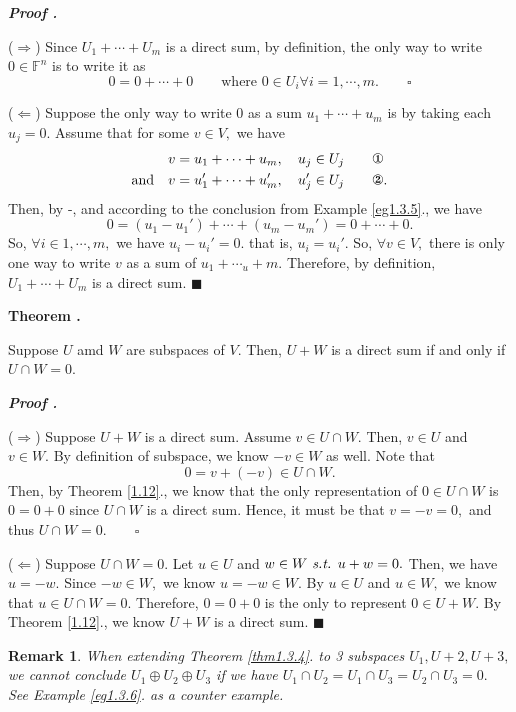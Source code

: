 \documentclass[11pt, letterpaper]{article}
\newcounter{neg}[subsection]
\newcommand*{\egref}[1]{Example \ref{#1}.\theneg}
\newcounter{nthm}[subsection]
\newenvironment*{thm}[1]{\begin{framed}\par\noindent\textbf{Theorem \thesubsection.\stepcounter{nthm}\thenthm\ #1} \par}{\par\end{framed}}
\newcommand*{\thmref}[1]{Theorem \ref{#1}.\thenthm}
\newcounter{nprf}[subsection]
\newenvironment*{prf}{\par\noindent\textbf{\textit{Proof \stepcounter{nprf}\thenprf.}}}{\hfill$\blacksquare$\par}
\newtheorem*{rmk}{Remark}
\def\F{\mathbb{F}}
\def\st{\emph{ s.t. }}
\begin{document}
	\begin{prf}
		\par ($\Rightarrow$) Since $U_1+\cdots+U_m$ is a direct sum, by definition, the only way to write $0\in\F^n$ is to write it as \[0=0+\cdots+0\qquad\text{where }0\in U_i\forall i=1,\cdots,m.\qquad\square\]\par 
		($\Leftarrow$) Suppose the only way to write $0$ as a sum $u_1+\cdots+u_m$ is by taking each $u_j=0.$ Assume that for some $v\in V,$ we have \[\begin{aligned}v&=u_1+\cdots+u_m,\quad u_j\in U_j\qquad\text{\ding{172}}\\\text{and}\quad v&=u_1'+\cdots+u_m',\quad u_j'\in U_j \qquad\text{\ding{173}}.\end{aligned}\] Then, by -, and according to the conclusion from \egref{eg1.3.5}, we have \[0=(u_1-u_1')+\cdots+(u_m-u_m')=0+\cdots+0.\] So, $\forall i\in 1,\cdots,m,$ we have $u_i-u_i'=0.$ that is, $u_i=u_i'.$ So, $\forall v\in V,$ there is only one way to write $v$ as a sum of $u_1+\cdots_u+m.$ Therefore, by definition, $U_1+\cdots+U_m$ is a direct sum. 
	\end{prf}
\begin{thm}{}\label{thm1.3.4}
	Suppose	$U$ amd $W$ are subspaces of $V$. Then, $U+W$ is a direct sum if and only if $U\cap W=\qty{0}$.
\end{thm}
	\begin{prf}
		\par ($\Rightarrow$) Suppose $U+W$ is a direct sum. Assume $v\in U\cap W.$ Then, $v\in U$ and $v\in W.$ By definition of subspace, we know $-v\in W$ as well. Note that \[0=v+(-v)\in U\cap W.\] Then, by \thmref{1.12}, we know that the only representation of $0\in U\cap W$ is $0=0+0$ since $U\cap W$ is a direct sum. Hence, it must be that $v=-v=0,$ and thus $U\cap W=\qty{0}.\qquad\square$\par 
		($\Leftarrow$) Suppose $U\cap W=\qty{0}.$ Let $u\in U$ and $w\in W\st u+w=0.$ Then, we have $u=-w.$ Since $-w\in W,$ we know $u=-w\in W.$ By $u\in U$ and $u\in W,$ we know that $u\in U\cap W=\qty{0}.$ Therefore, $0=0+0$ is the only to represent $0\in U+W.$ By \thmref{1.12}, we know $U+W$ is a direct sum.
	\end{prf}
\begin{rmk}
	When extending \thmref{thm1.3.4} to 3 subspaces $U_1,U+2,U+3,$ we cannot conclude $U_1\oplus U_2\oplus U_3$ if we have $U_1\cap U_2=U_1\cap U_3=U_2\cap U_3=\qty{0}.$ See \egref{eg1.3.6} as a counter example.
\end{rmk}
\end{document}
